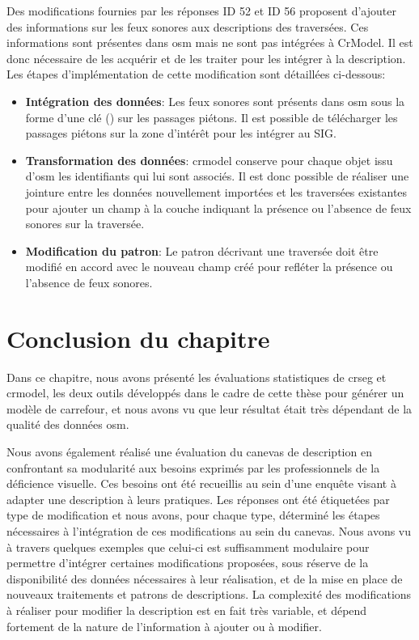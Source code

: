 \newpar{}

Des modifications fournies par les réponses ID 52 et ID 56 proposent d'ajouter des informations sur les feux sonores aux descriptions des traversées. Ces informations sont présentes dans \gls{osm} mais ne sont pas intégrées à CrModel. Il est donc nécessaire de les acquérir et de les traiter pour les intégrer à la description. Les étapes d'implémentation de cette modification sont détaillées ci-dessous:

\begin{itemize}
    \item \textbf{Intégration des données}: Les feux sonores sont présents dans \gls{osm} sous la forme d'une clé () sur les passages piétons. Il est possible de télécharger les passages piétons sur la zone d'intérêt pour les intégrer au SIG.
    \item \textbf{Transformation des données}: crmodel conserve pour chaque objet issu d'\gls{osm} les identifiants qui lui sont associés. Il est donc possible de réaliser une jointure entre les données nouvellement importées et les traversées existantes pour ajouter un champ à la couche indiquant la présence ou l'absence de feux sonores sur la traversée.
    \item \textbf{Modification du patron}: Le patron décrivant une traversée doit être modifié en accord avec le nouveau champ créé pour refléter la présence ou l'absence de feux sonores.
\end{itemize}

\section{Conclusion du chapitre}

Dans ce chapitre, nous avons présenté les évaluations statistiques de crseg et crmodel, les deux outils développés dans le cadre de cette thèse pour générer un modèle de carrefour,  et nous avons vu que leur résultat était très dépendant de la qualité des données \gls{osm}. 

\newpar{}

Nous avons également réalisé une évaluation du canevas de description en confrontant sa modularité aux besoins exprimés par les professionnels de la déficience visuelle. Ces besoins ont été recueillis au sein d'une enquête visant à adapter une description à leurs pratiques. Les réponses ont été étiquetées par type de modification et nous avons, pour chaque type, déterminé les étapes nécessaires à l'intégration de ces modifications au sein du canevas. Nous avons vu à travers quelques exemples que celui-ci est suffisamment modulaire pour permettre d'intégrer certaines modifications proposées, sous réserve de la disponibilité des données nécessaires à leur réalisation, et de la mise en place de nouveaux traitements et patrons de descriptions. La complexité des modifications à réaliser pour modifier la description est en fait très variable, et dépend fortement de la nature de l'information à ajouter ou à modifier.